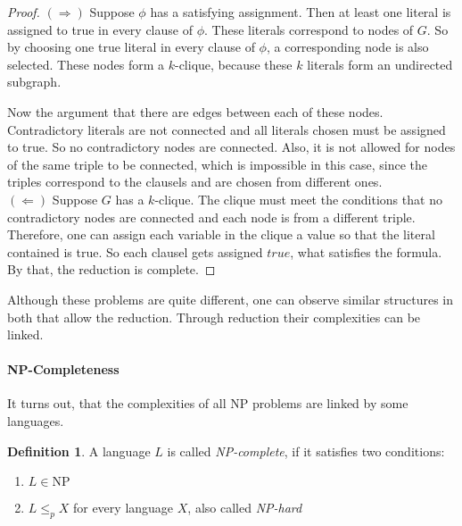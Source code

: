 \documentclass[10pt,fleqn]{article}
\theoremstyle{definition}
\newtheorem{definition}{Definition}
\theoremstyle{remark}
\newcommand{\npclass}{\text{NP}}
\begin{document}
\begin{proof}
    \((\Rightarrow)\) Suppose \(\phi\) has a satisfying assignment. Then at least one literal is assigned to true in every clause of \(\phi\). These literals correspond to nodes of \(G\). So by choosing one true literal in every clause of \(\phi\), a corresponding node is also selected. These nodes form a \(k\)-clique, because these \(k\) literals form an undirected subgraph.

    Now the argument that there are edges between each of these nodes. Contradictory literals are not connected and all literals chosen must be assigned to true. So no contradictory nodes are connected. Also, it is not allowed for nodes of the same triple to be connected, which is impossible in this case, since the triples correspond to the clausels and are chosen from different ones.\\

    \((\Leftarrow)\) Suppose \(G\) has a \(k\)-clique. The clique must meet the conditions that no contradictory nodes are connected and each node is from a different triple. Therefore, one can assign each variable in the clique a value so that the literal contained is true. So each clausel gets assigned \(true\), what satisfies the formula.\\

    By that, the reduction is complete.
\end{proof}

Although these problems are quite different, one can observe similar structures in both that allow the reduction. Through reduction their complexities can be linked.

\paragraph{NP-Completeness} It turns out, that the complexities of all NP problems are linked by some languages.

\begin{definition} A language \(L\) is called \emph{NP-complete}, if it satisfies two conditions:
    \begin{enumerate}

        \item \(L \in \npclass\)

        \item \(L \leq_p X\) for every language \(X\), also called \emph{NP-hard}

    \end{enumerate}
\end{definition}
\end{document}
